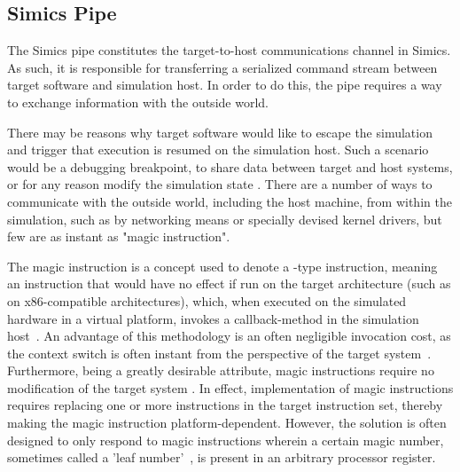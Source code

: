 \subsection{Simics Pipe}
\label{sec:proposedsolutionandimplementation_simicspipe}
The Simics pipe constitutes the target-to-host communications channel in Simics.
As such, it is responsible for transferring a serialized command stream between target software and simulation host.
In order to do this, the pipe requires a way to exchange information with the outside world.

There may be reasons why target software would like to escape the simulation and trigger that execution is resumed on the simulation host.
Such a scenario would be a debugging breakpoint, to share data between target and host systems, or for any reason modify the simulation state .
There are a number of ways to communicate with the outside world, including the host machine, from within the simulation, such as by networking means or specially devised kernel drivers, but few are as instant as "magic instruction".

The magic instruction is a concept used to denote a -type instruction, meaning an instruction that would have no effect if run on the target architecture (such as  on x86-compatible architectures), which, when executed on the simulated hardware in a virtual platform, invokes a callback-method in the simulation host~.
An advantage of this methodology is an often negligible invocation cost, as the context switch is often instant from the perspective of the target system~.
Furthermore, being a greatly desirable attribute, magic instructions require no modification of the target system .
In effect, implementation of magic instructions requires replacing one or more instructions in the target instruction set, thereby making the magic instruction platform-dependent.
However, the solution is often designed to only respond to magic instructions wherein a certain magic number, sometimes called a 'leaf number'~, is present in an arbitrary processor register.

